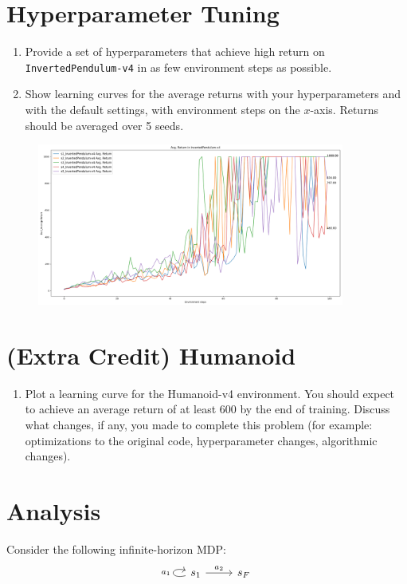 \documentclass{article}
\begin{document}
\newpage\section{Hyperparameter Tuning}
\begin{enumerate}
    \item Provide a set of hyperparameters that achieve high return on \verb|InvertedPendulum-v4| in as few environment steps as possible.
    \item Show learning curves for the average returns with your hyperparameters and with the default settings, with environment steps on the $x$-axis. Returns should be averaged over 5 seeds.
\end{enumerate}
\begin{figure}[H]
    \centering
    \includegraphics[width=0.9\textwidth]{hw2_hyperparameter.png}
\end{figure}

\newpage\section{(Extra Credit) Humanoid}
\begin{enumerate}
    \item Plot a learning curve for the Humanoid-v4 environment. You should expect to achieve an average return of at least 600 by the end of training. Discuss what changes, if any, you made to complete this problem (for example: optimizations to the original code, hyperparameter changes, algorithmic changes).
\end{enumerate}

\newpage\section{Analysis}
\label{sec:analysis}
Consider the following infinite-horizon MDP:
\[\begin{tikzcd}
	s_1 & {s_F}
	\arrow["{a_2}", from=1-1, to=1-2]
    \arrow["{a_1}", loop left, from=1-1, to=1-1]
\end{tikzcd}\]
\newcommand{\Rmax}[0]{R_{\textrm{max}}}
\newcommand{\E}[0]{\mathbb{E}}
\newcommand{\var}[0]{\textrm{Var}}
\newcommand\question[1][]{\item\refstepcounter{subsection}\label[question]{#1}}
\end{document}
